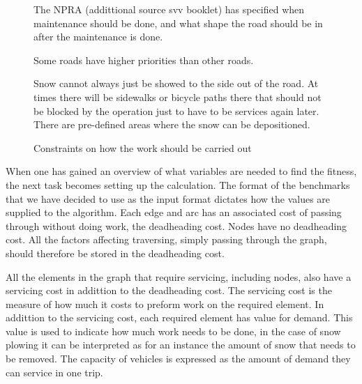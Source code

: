 \begin{figure}[thbp]
\caption{Constraints on how the work should be carried out}
\label{fig:imposed_constraints}
\begin{description}
	\item [Equipment] \begin{description} \item 
		\item [Amount of vehicles available.]
		\item [Types of vehicles available.]
	\end{description}
	\item [The order the roads are serviced in.] 
	\item [The weather.] The NPRA (addittional source svv booklet) has specified when maintenance should be done, and what shape the road should be in after the maintenance is done.
	\item [The type of road.] Some roads have higher priorities than other roads.
	\item [Where the snow can be stored.] Snow cannot always just be showed to the side out of the road. At times there will be sidewalks or bicycle paths there that should not be blocked by the operation just to have to be services again later. There are pre-defined areas where the snow can be depositioned.
\end{description}
\end{figure}


When one has gained an overview of what variables are needed to find the fitness, the next task becomes setting up the calculation. The format of the benchmarks that we have decided to use as the input format dictates how the values are supplied to the algorithm. Each edge and arc has an associated cost of passing through without doing work, the deadheading cost. Nodes have no deadheading cost. All the factors affecting traversing, simply passing through the graph, should therefore be stored in the deadheading cost.

All the elements in the graph that require servicing, including nodes, also have a servicing cost in addittion to the deadheading cost. The servicing cost is the measure of how much it costs to preform work on the required element. In addittion to the servicing cost, each required element has value for demand. This value is used to indicate how much work needs to be done, in the case of snow plowing it can be interpreted as for an instance the amount of snow that needs to be removed. The capacity of vehicles is expressed as the amount of demand they can service in one trip.

